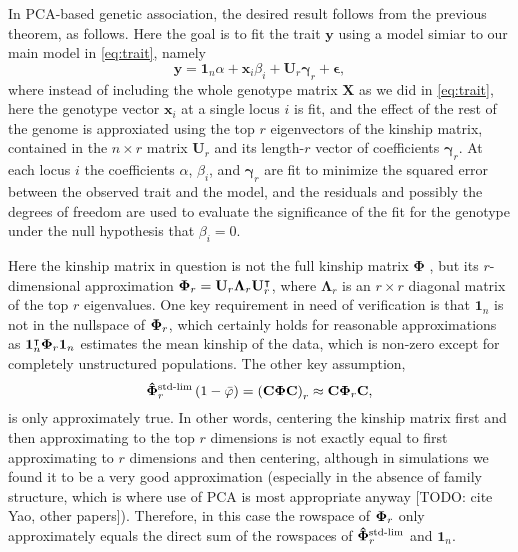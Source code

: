\documentclass[11pt]{article}
\newcommand{\kinMat}{%
  \ensuremath{%
    \mathbf{\Phi}
  }%
  \xspace%
}%
\newcommand{\kinMatStdLim}{%
  \ensuremath{%
    \mathbf{\hat{\Phi}}^\text{std-lim}
  }%
  \xspace%
}%
\begin{document}
In PCA-based genetic association, the desired result follows from the previous theorem, as follows.
Here the goal is to fit the trait $\mathbf{y}$ using a model simiar to our main model in \cref{eq:trait}, namely
\begin{equation}
  \label{eq:pca_gwas}
  \mathbf{y}
  =
  \mathbf{1}_n \alpha + \mathbf{x}_i \beta_i + \mathbf{U}_r \mathbf{\gamma}_r + \mathbf{\epsilon}
  ,
\end{equation}
where instead of including the whole genotype matrix $\mathbf{X}$ as we did in \cref{eq:trait}, here the genotype vector $\mathbf{x}_i$ at a single locus $i$ is fit, and the effect of the rest of the genome is approxiated using the top $r$ eigenvectors of the kinship matrix, contained in the $n \times r$ matrix $\mathbf{U}_r$ and its length-$r$ vector of coefficients $\mathbf{\gamma}_r$.
At each locus $i$ the coefficients $\alpha$, $\beta_i$, and $\mathbf{\gamma}_r$ are fit to minimize the squared error between the observed trait and the model, and the residuals and possibly the degrees of freedom are used to evaluate the significance of the fit for the genotype under the null hypothesis that $\beta_i = 0$.

Here the kinship matrix in question is not the full kinship matrix \kinMat, but its $r$-dimensional approximation $\kinMat_r = \mathbf{U}_r \mathbf{\Lambda}_r \mathbf{U}_r^\intercal$, where $\mathbf{\Lambda}_r$ is an $r \times r$ diagonal matrix of the top $r$ eigenvalues.
One key requirement in need of verification is that $\mathbf{1}_n$ is not in the nullspace of $\kinMat_r$, which certainly holds for reasonable approximations as $\mathbf{1}_n^\intercal \kinMat_r \mathbf{1}_n$ estimates the mean kinship of the data, which is non-zero except for completely unstructured populations.
The other key assumption,
$$
\kinMatStdLim_r \left( 1 - \bar{\varphi} \right)
=
\left( \mathbf{C} \kinMat \mathbf{C} \right)_r
\approx
\mathbf{C} \kinMat_r \mathbf{C},
$$
is only approximately true.
In other words, centering the kinship matrix first and then approximating to the top $r$ dimensions is not exactly equal to first approximating to $r$ dimensions and then centering, although in simulations we found it to be a very good approximation (especially in the absence of family structure, which is where use of PCA is most appropriate anyway [TODO: cite Yao, other papers]).
Therefore, in this case the rowspace of $\kinMat_r$ only approximately equals the direct sum of the rowspaces of $\kinMatStdLim_r$ and $\mathbf{1}_n$.
\end{document}
